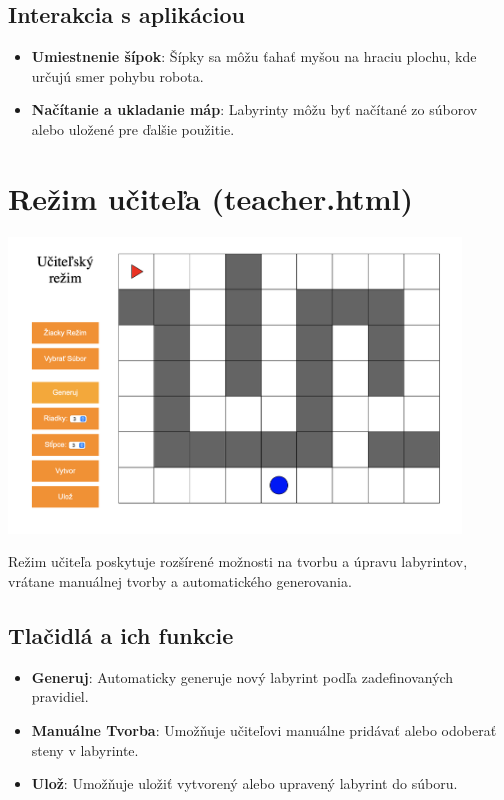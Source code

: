 \documentclass{article}
\begin{document}
\subsection*{Interakcia s aplikáciou}
\begin{itemize}
    \item \textbf{Umiestnenie šípok}: Šípky sa môžu ťahať myšou na hraciu plochu, kde určujú smer pohybu robota.
    \item \textbf{Načítanie a ukladanie máp}: Labyrinty môžu byť načítané zo súborov alebo uložené pre ďalšie použitie.
\end{itemize}

\section*{Režim učiteľa (teacher.html)}

\begin{center}
    \includegraphics[width=12cm]{teacher.png}
\end{center}

Režim učiteľa poskytuje rozšírené možnosti na tvorbu a úpravu labyrintov, vrátane manuálnej tvorby a automatického generovania.

\subsection*{Tlačidlá a ich funkcie}
\begin{itemize}
    \item \textbf{Generuj}: Automaticky generuje nový labyrint podľa zadefinovaných pravidiel.
    \item \textbf{Manuálne Tvorba}: Umožňuje učiteľovi manuálne pridávať alebo odoberať steny v labyrinte.
    \item \textbf{Ulož}: Umožňuje uložiť vytvorený alebo upravený labyrint do súboru.
\end{itemize}
\end{document}
